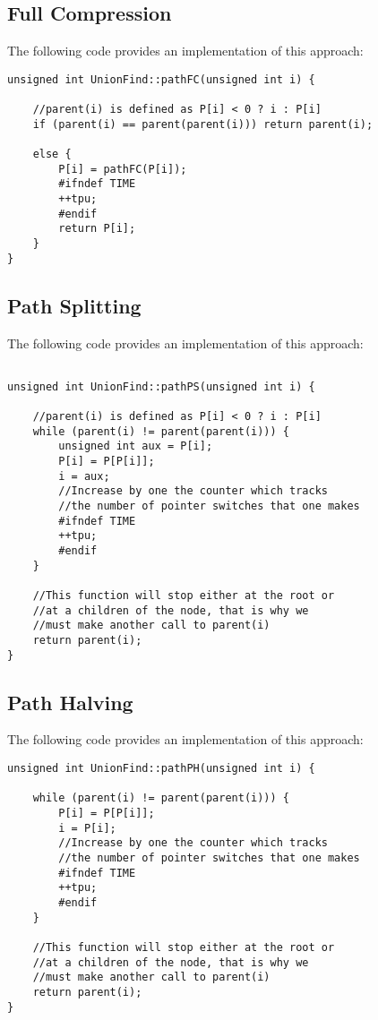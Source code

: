 \subsection{Full Compression}
The following code provides an implementation of this approach:

\begin{verbatim}
unsigned int UnionFind::pathFC(unsigned int i) {

    //parent(i) is defined as P[i] < 0 ? i : P[i]
    if (parent(i) == parent(parent(i))) return parent(i);

    else {
        P[i] = pathFC(P[i]);
        #ifndef TIME
        ++tpu;
        #endif
        return P[i];
    }
}
\end{verbatim}

\subsection{Path Splitting}
The following code provides an implementation of this approach:

\begin{verbatim}

unsigned int UnionFind::pathPS(unsigned int i) {

    //parent(i) is defined as P[i] < 0 ? i : P[i]
    while (parent(i) != parent(parent(i))) {
        unsigned int aux = P[i];
        P[i] = P[P[i]];
        i = aux;
        //Increase by one the counter which tracks 
        //the number of pointer switches that one makes
        #ifndef TIME
        ++tpu;
        #endif
    }

    //This function will stop either at the root or
    //at a children of the node, that is why we 
    //must make another call to parent(i)
    return parent(i);
}
\end{verbatim}


\subsection{Path Halving}
The following code provides an implementation of this approach:

\begin{verbatim}
unsigned int UnionFind::pathPH(unsigned int i) {

    while (parent(i) != parent(parent(i))) {
        P[i] = P[P[i]];
        i = P[i];
        //Increase by one the counter which tracks 
        //the number of pointer switches that one makes
        #ifndef TIME
        ++tpu;
        #endif
    }

    //This function will stop either at the root or
    //at a children of the node, that is why we 
    //must make another call to parent(i)
    return parent(i);
}
\end{verbatim}

